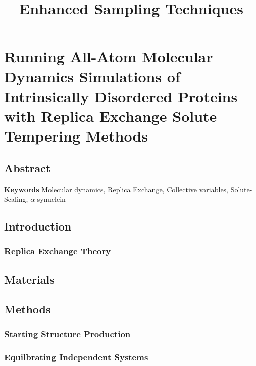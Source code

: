 \documentclass{memoir}
\title{Enhanced Sampling Techniques}
\begin{document}
\date{}

\maketitle

\tableofcontents

\chapter{Running All-Atom Molecular Dynamics Simulations of Intrinsically Disordered Proteins with Replica Exchange Solute Tempering Methods}

\section{Abstract}


\textbf{Keywords} Molecular dynamics, Replica Exchange, Collective variables, Solute-Scaling, $\alpha$-synuclein

\section{Introduction}\label{sec:Intro}

    


\subsection{Replica Exchange Theory}


\section{Materials}



\section{Methods}

\subsection{Starting Structure Production}

\subsection{Equilbrating Independent Systems}

\end{document}
